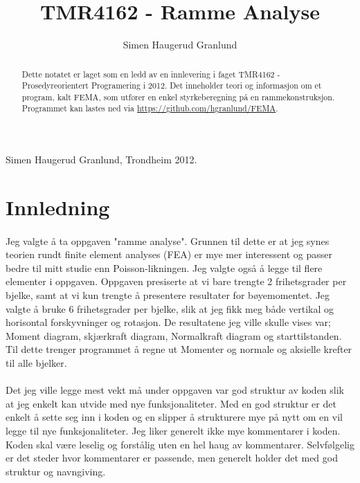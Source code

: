 \documentclass[10pt,a4paper, norsk]{article}
\author{Simen Haugerud Granlund}
\title{TMR4162 - Ramme Analyse}
\begin{document}
\maketitle

\thispagestyle{empty} 	%
\newpage %

\begin{abstract}
Dette notatet er laget som en ledd av en innlevering i faget TMR4162 - Prosedyreorientert Programering i 2012. Det inneholder teori og informasjon om et program, kalt FEMA, som utfører en enkel styrkeberegning på en rammekonstruksjon. Programmet kan lastes ned via \url{https://github.com/hgranlund/FEMA}.
\end{abstract}

\begin{flushright}
Simen Haugerud Granlund, Trondheim 2012.
\end{flushright}
\newpage


\tableofcontents
\newpage


\section{Innledning}
\paragraph{}
Jeg valgte å ta oppgaven "ramme analyse". Grunnen til dette er at jeg synes teorien rundt finite element analyses (FEA) er mye mer interessent og passer bedre til mitt studie enn Poisson-likningen. Jeg valgte også å legge til flere elementer i oppgaven. Oppgaven presiserte at vi bare trengte 2 frihetsgrader per bjelke, samt at vi kun trengte å presentere resultater for bøyemomentet. Jeg valgte å bruke 6 frihetsgrader per bjelke, slik at jeg fikk meg både  vertikal og horisontal forskyvninger og rotasjon. De resultatene jeg ville skulle vises var; Moment diagram, skjærkraft diagram, Normalkraft diagram og starttilstanden. Til dette trenger programmet å regne ut Momenter og normale og aksielle krefter til alle bjelker.

\paragraph{}
Det jeg ville legge mest vekt må under oppgaven var god struktur av koden slik at jeg enkelt kan utvide med nye funksjonaliteter. Med en god struktur er det enkelt å sette seg inn i koden og en slipper å strukturere mye på nytt om en vil legge til nye funksjonaliteter. Jeg liker generelt ikke mye kommentarer i koden. Koden skal være leselig og forstålig uten en hel haug av kommentarer. Selvfølgelig er det steder hvor kommentarer er passende, men generelt holder det med god struktur og navngiving.
\end{document}
